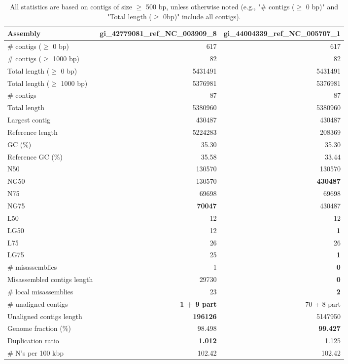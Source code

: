 \documentclass[12pt,a4paper]{article}
\begin{document}
\begin{table}[ht]
\begin{center}
\caption{All statistics are based on contigs of size $\geq$ 500 bp, unless otherwise noted (e.g., "\# contigs ($\geq$ 0 bp)" and "Total length ($\geq$ 0bp)" include all contigs).}
\begin{tabular}{|l*{2}{|r}|}
\hline
Assembly & gi\_42779081\_ref\_NC\_003909\_8 & gi\_44004339\_ref\_NC\_005707\_1 \\ \hline
\# contigs ($\geq$ 0 bp) & 617 & 617 \\ \hline
\# contigs ($\geq$ 1000 bp) & 82 & 82 \\ \hline
Total length ($\geq$ 0 bp) & 5431491 & 5431491 \\ \hline
Total length ($\geq$ 1000 bp) & 5376981 & 5376981 \\ \hline
\# contigs & 87 & 87 \\ \hline
Total length & 5380960 & 5380960 \\ \hline
Largest contig & 430487 & 430487 \\ \hline
Reference length & 5224283 & 208369 \\ \hline
GC (\%) & 35.30 & 35.30 \\ \hline
Reference GC (\%) & 35.58 & 33.44 \\ \hline
N50 & 130570 & 130570 \\ \hline
NG50 & 130570 & {\bf 430487} \\ \hline
N75 & 69698 & 69698 \\ \hline
NG75 & {\bf 70047} & 430487 \\ \hline
L50 & 12 & 12 \\ \hline
LG50 & 12 & {\bf 1} \\ \hline
L75 & 26 & 26 \\ \hline
LG75 & 25 & {\bf 1} \\ \hline
\# misassemblies & 1 & {\bf 0} \\ \hline
Misassembled contigs length & 29730 & {\bf 0} \\ \hline
\# local misassemblies & 23 & {\bf 2} \\ \hline
\# unaligned contigs & {\bf 1 + 9 part} & 70 + 8 part \\ \hline
Unaligned contigs length & {\bf 196126} & 5147950 \\ \hline
Genome fraction (\%) & 98.498 & {\bf 99.427} \\ \hline
Duplication ratio & {\bf 1.012} & 1.125 \\ \hline
\# N's per 100 kbp & 102.42 & 102.42 \\ \hline

\end{tabular}
\end{center}
\end{table}
\end{document}
